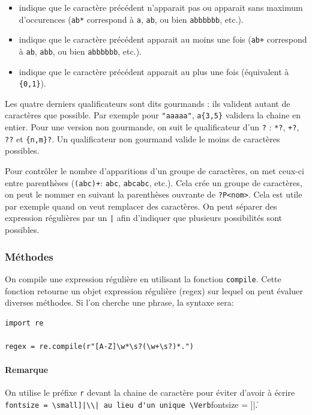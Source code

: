 \documentclass[a4paper, french, 10pt]{article}
\newcommand{\code}[1]{{\small\texttt{#1}}}
\begin{document}
\begin{description}
\begin{itemize}
        \item \og\code{*}\fg{} indique que le caractère précédent n'apparait pas ou apparait sans maximum d'occurences (\code{ab*} correspond à \code{a}, \code{ab}, ou bien \code{abbbbbb}, etc.).
        \item \og\code{+}\fg{} indique que le caractère précédent apparait au moins une fois (\code{ab+} correspond à \code{ab}, \code{abb}, ou bien \code{abbbbbb}, etc.).
        \item \og\code{?}\fg{} indique que le caractère précédent apparait au plus une fois (équivalent à \code{\{0,1\}}).
    \end{itemize}
\end{description}

Les quatre derniers qualificateurs sont dits gourmands : ils valident autant de caractères que possible. Par exemple pour \code{"aaaaa"}, \code{a\{3,5\}} validera la chaine en entier. Pour une version non gourmande, on suit le qualificateur d'un \code{?} : \code{*?}, \code{+?}, \code{??} et \code{\{n,m\}?}. Un qualificateur non gourmand valide le moins de caractères possibles.\bigskip

Pour contrôler le nombre d'apparitions d'un groupe de caractères, on met ceux-ci entre parenthèses (\code{(abc)+}: \code{abc}, \code{abcabc}, etc.). Cela crée un groupe de caractères, on peut le nommer en suivant la parenthèses ouvrante de \code{?P<nom>}. Cela est utile par exemple quand on veut remplacer des caractères. On peut séparer des expression régulières par un \code{|} afin d'indiquer que plusieurs possibilités sont possibles.\bigskip

\subsubsection{Méthodes}
On compile une expression régulière en utilisant la fonction \code{compile}. Cette fonction retourne un objet expression régulière (regex) sur lequel on peut évaluer diverses méthodes. Si l'on cherche une phrase, la syntaxe sera:

\begin{verbatim}
import re

regex = re.compile(r"[A-Z]\w*\s?(\w+\s?)*.")
\end{verbatim}

\paragraph{Remarque} On utilise le préfixe \code{r} devant la chaine de caractère pour éviter d'avoir à écrire \Verb[fontsize = \small]|\\| au lieu d'un unique \Verb[fontsize = \small]|\|.\bigskip
\end{document}
